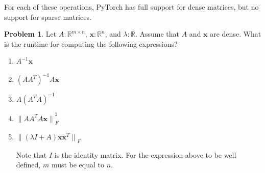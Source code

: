 \documentclass[10pt]{article}
\theoremstyle{definition}
\newtheorem{problem}{Problem}
\newcommand{\R}{\mathbb R}
\newcommand{\trans}[1]{{#1}^{T}}
\newcommand{\x}{\mathbf x}
\newcommand{\ltwo}[1]{{\lVert {#1} \rVert}_2}
\newcommand{\lp}[1]{{\lVert {#1} \rVert}_p}
\newcommand{\lF}[1]{{\lVert {#1} \rVert}_F}
\begin{document}
For each of these operations, PyTorch has full support for dense matrices,
but no support for sparse matrices.

%
%
\begin{problem}
    Let $A : \R^{m \times n}$, $\x : \R^n$, and $\lambda : \R$.
    Assume that $A$ and $\x$ are dense.
    What is the runtime for computing the following expressions?
    \begin{enumerate}
        \item $A^{-1}\x$
            \vspace{4in}
            \newpage
        \item $(A \trans A)^{-1} A \x$
            \vspace{4in}
            \newpage
        \item $A (\trans A A)^{-1}$
            \vspace{4in}
            \newpage
        \item $\lF{A \trans A A \x}^2$
            \vspace{4in}
            \newpage
        \item $\lF{(\lambda I + A) \x \trans \x}$

            Note that $I$ is the identity matrix.
            For the expression above to be well defined, $m$ must be equal to $n$.
            \vspace{4in}
    \end{enumerate}
\end{problem}
\end{document}
